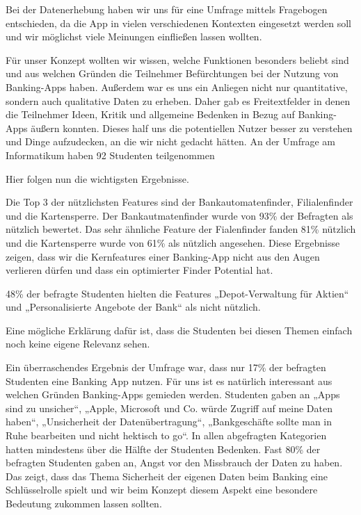 	Bei der Datenerhebung haben wir uns für eine Umfrage mittels Fragebogen entschieden, da die App in vielen verschiedenen Kontexten eingesetzt werden soll und wir möglichst viele Meinungen einfließen lassen wollten. 
	
	Für unser Konzept wollten wir wissen, welche Funktionen besonders beliebt sind und aus welchen Gründen die Teilnehmer Befürchtungen bei der Nutzung von Banking-Apps haben. Außerdem war es uns ein Anliegen nicht nur quantitative, sondern auch qualitative Daten zu erheben. Daher gab es Freitextfelder in denen die Teilnehmer Ideen, Kritik und allgemeine Bedenken in Bezug auf Banking-Apps äußern konnten. Dieses half uns die potentiellen Nutzer besser zu verstehen und Dinge aufzudecken, an die wir nicht gedacht hätten. An der Umfrage am Informatikum haben 92 Studenten teilgenommen
	
	Hier folgen nun die wichtigsten Ergebnisse. 

	Die Top 3 der nützlichsten Features sind der Bankautomatenfinder,  Filialenfinder und die Kartensperre. Der Bankautmatenfinder wurde von 93\% der Befragten als nützlich bewertet. Das sehr ähnliche Feature der Fialenfinder fanden 81\% nützlich und die Kartensperre wurde von 61\% als nützlich angesehen. Diese Ergebnisse zeigen, dass wir die Kernfeatures einer Banking-App nicht aus den Augen verlieren dürfen und dass ein optimierter Finder Potential hat.
	
	48\% der befragte Studenten hielten die Features „Depot-Verwaltung für Aktien“ und „Personalisierte Angebote der Bank“ als nicht nützlich.
	
	Eine mögliche Erklärung dafür ist, dass die Studenten bei diesen Themen einfach noch keine eigene Relevanz sehen. 
	
	Ein überraschendes Ergebnis der Umfrage war, dass nur 17\% der befragten Studenten eine Banking App nutzen. Für uns ist es natürlich interessant aus welchen Gründen Banking-Apps gemieden werden. Studenten gaben an „Apps sind zu unsicher“, „Apple, Microsoft und Co. würde Zugriff auf meine Daten haben“, „Unsicherheit der Datenübertragung“, „Bankgeschäfte sollte man in Ruhe bearbeiten und nicht hektisch to go“. In allen abgefragten Kategorien hatten mindestens über die Hälfte der Studenten Bedenken. Fast 80\% der befragten Studenten gaben an,  Angst vor den Missbrauch der Daten zu haben. Das zeigt, dass das Thema Sicherheit der eigenen Daten beim Banking eine Schlüsselrolle spielt und wir beim Konzept diesem Aspekt eine besondere Bedeutung zukommen lassen sollten. 
